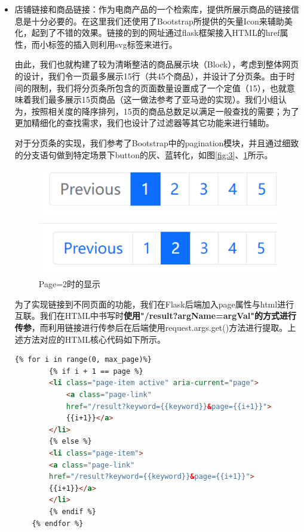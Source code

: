 \documentclass[a4paper,12pt]{article}
\begin{document}
\begin{itemize}
    \item 店铺链接和商品链接：作为电商产品的一个检索库，提供所展示商品的链接信息是十分必要的。在这里我们还使用了Bootstrap所提供的矢量Icon来辅助美化，起到了不错的效果。链接的到的网址通过flask框架接入HTML的href属性，而小标签的插入则利用svg标签来进行。
    
    由此，我们也就构建了较为清晰整洁的商品展示块（Block），考虑到整体网页的设计，我们令一页最多展示15行（共45个商品），并设计了分页条。由于时间的限制，我们将分页条所包含的页面数量设置成了一个定值（15），也就意味着我们最多展示15页商品（这一做法参考了亚马逊的实现）。我们小组认为，按照相关度的降序排列，15页的商品总数足以满足一般查找的需要；为了更加精细化的查找需求，我们也设计了过滤器等其它功能来进行辅助。

    对于分页条的实现，我们参考了Bootstrap中的pagination模块，并且通过细致的分支语句做到特定场景下button的灰、蓝转化，如图\ref{fig:3}、\ref{fig:4}所示。

    \begin{figure}[H]
        \begin{minipage}{0.49\textwidth}
            \centering
            \includegraphics[scale=0.5]{pic/pic3.png}
            \caption{Page=1时的显示}
            \label{fig:3}
        \end{minipage}
        \begin{minipage}{0.49\textwidth}
            \centering
            \includegraphics[scale=0.5]{pic/pic4.png}
            \caption{Page=2时的显示}
            \label{fig:4}
        \end{minipage}
    \end{figure}

    为了实现链接到不同页面的功能，我们在Flask后端加入page属性与html进行互联。我们在HTML中书写时\textbf{使用"/result?argName={{argVal}}"的方式进行传参}，而利用链接进行传参后在后端使用request.args.get()方法进行提取。上述方法对应的HTML核心代码如下所示。

    \begin{lstlisting}[language=html]
    {% for i in range(0, max_page)%}
        {% if i + 1 == page %}
        <li class="page-item active" aria-current="page">
            <a class="page-link" 
            href="/result?keyword={{keyword}}&page={{i+1}}">
            {{i+1}}</a>
        </li>
        {% else %}
        <li class="page-item">
        <a class="page-link" 
        href="/result?keyword={{keyword}}&page={{i+1}}">
        {{i+1}}</a>
        </li>
        {% endif %}
    {% endfor %}
    \end{lstlisting}


\end{itemize}
\end{document}
